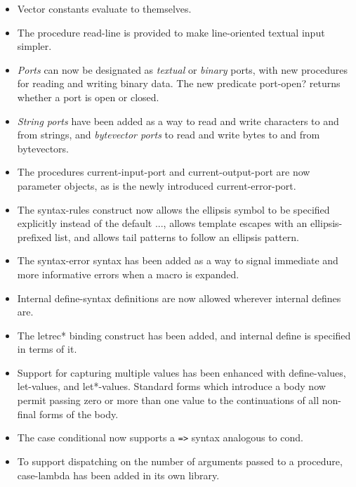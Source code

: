 \begin{itemize}
\item Vector constants evaluate to themselves.

\item The procedure {\cf read-line} is provided to make line-oriented textual input
simpler.

\item {\em Ports} can now be designated as {\em textual} or {\em
binary} ports, with new procedures for reading and writing binary
data.
The new predicate {\cf port-open?} returns whether a port is open or closed.

\item {\em String ports} have been added as a way to read and write
characters to and from strings, and {\em bytevector ports} to read
and write bytes to and from bytevectors.

\item The procedures {\cf current-input-port} and {\cf current-output-port} are now
parameter objects, as is the newly introduced {\cf
current-error-port}.

\item The {\cf syntax-rules} construct now allows
the ellipsis symbol to be specified explicitly instead of the default
{\cf ...}, allows template escapes with an ellipsis-prefixed list, and
allows tail patterns to follow an ellipsis pattern.

\item The {\cf syntax-error} syntax has been added as a way to signal immediate
and more informative errors when a macro is expanded.

\item Internal {\cf define-syntax} definitions are now allowed wherever
internal {\cf define}s are.

\item The {\cf letrec*} binding construct has been added, and internal {\cf define} 
is specified in terms of it.

\item Support for capturing multiple values has been enhanced with {\cf
define-values}, {\cf let-values}, and {\cf let*-values}.
Standard forms which introduce a body now permit passing zero or more than
one value to the continuations of all non-final forms of the body.

\item The {\cf case} conditional now supports a {\tt =>} syntax analogous to {\cf cond}.

\item To support dispatching on the number of arguments passed to a
procedure, {\cf case-lambda} has been added in its own library.


\end{itemize}
